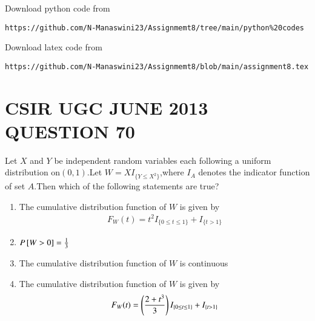 \documentclass[journal,12pt,twocolumn]{IEEEtran}
\begin{document}
\renewcommand{\thefigure}{\theenumi}
\renewcommand{\thetable}{\theenumi}
Download python code from 
\begin{lstlisting}
https://github.com/N-Manaswini23/Assignmemt8/tree/main/python%20codes
\end{lstlisting}
%
Download latex code from 
\begin{lstlisting}
https://github.com/N-Manaswini23/Assignmemt8/blob/main/assignment8.tex
\end{lstlisting}
%

\section*{CSIR UGC JUNE 2013 QUESTION 70}
Let $X$ and $Y$ be independent random variables each following a uniform distribution on$(0,1)$.Let $W=XI_{\{Y\leq X^2\}}$,where $I_A$ denotes the indicator function of set $A$.Then which of the following statements are true? \\
\begin{enumerate}
\item The cumulative distribution function of $W$ is given by
\begin{align}
  F_W(t)=t^2I_{\{0\leq t \leq 1\}}+ I_{\{t > 1\}}
\end{align}
\item $P{}\left[W>0\right]=\frac{1}{3}$
\item The cumulative distribution function of $W$ is continuous
\item The cumulative distribution function of $W$ is given by
\begin{align}
  F_W(t)=\left(\frac{2+t^3}{3}\right)I_{\{0\leq t \leq 1\}}+ I_{\{t > 1\}}
\end{align}
\end{enumerate}
\end{document}
